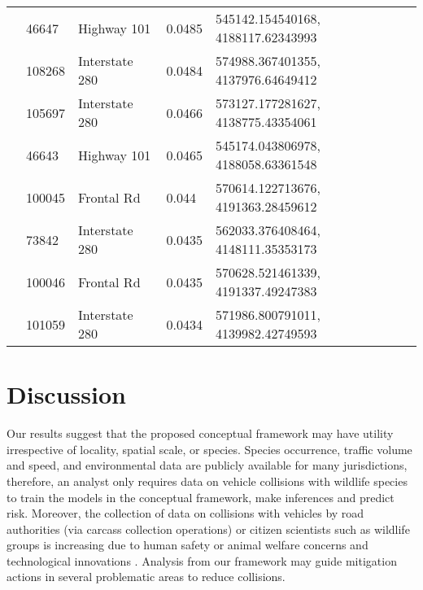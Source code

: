 \begin{table}[!h]
\begin{tabularx}{0.9\textwidth}{lllll}
           & 46647  & Highway 101     & 0.0485         & 545142.154540168, 4188117.62343993 \\
           & 108268 & Interstate 280  & 0.0484         & 574988.367401355, 4137976.64649412 \\
           & 105697 & Interstate 280  & 0.0466         & 573127.177281627, 4138775.43354061 \\
           & 46643  & Highway 101     & 0.0465         & 545174.043806978, 4188058.63361548 \\
           & 100045 & Frontal Rd      & 0.044          & 570614.122713676, 4191363.28459612 \\
           & 73842  & Interstate 280  & 0.0435         & 562033.376408464, 4148111.35353173 \\
           & 100046 & Frontal Rd      & 0.0435         & 570628.521461339, 4191337.49247383 \\
           & 101059 & Interstate 280  & 0.0434         & 571986.800791011, 4139982.42749593 \\
\bottomrule
\end{tabularx}
\label{rd_seg_risk}
\end{table}

\section{Discussion}

Our results suggest that the proposed conceptual framework may have utility irrespective of locality, spatial scale, or species.  Species occurrence, traffic volume and speed, and environmental data are publicly available for many jurisdictions, therefore, an analyst only requires data on vehicle collisions with wildlife species to train the models in the conceptual framework, make inferences and predict risk.  Moreover, the collection of data on collisions with vehicles by road authorities (via carcass collection operations) or citizen scientists such as wildlife groups is increasing due to human safety or animal welfare concerns and technological innovations \citep[see][]{olso14,shil15b}.  Analysis from our framework may guide mitigation actions in several problematic areas to reduce collisions.

